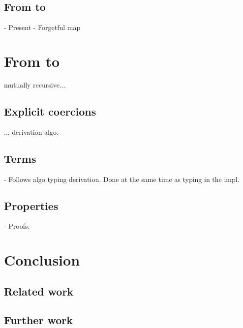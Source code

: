 \documentclass[twocolumn]{article}
\begin{document}
\subsection{From \CCq to \lng{}}
- Present \CCq
- Forgetful map

\section{From \lng{} to \CCq{}}
mutually recursive...

\subsection{Explicit coercions}
... derivation algo.

\subsection{Terms}
- Follows algo typing derivation. Done at the same time as typing in the
impl.

\subsection{Properties}
- Proofs.

\section{Conclusion}
\subsection{Related work}

\subsection{Further work}
\end{document}
